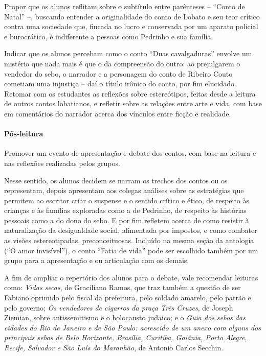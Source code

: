 \documentclass[11pt]{extarticle}
\begin{document}
Propor que os alunos reflitam sobre o subtítulo entre parênteses --
``Conto de Natal'' --, buscando entender a originalidade do conto de
Lobato e seu teor crítico contra uma sociedade que, fincada no lucro e
conservada por um aparato policial e burocrático, é indiferente a
pessoas como Pedrinho e sua família.

Indicar que os alunos percebam como o conto ``Duas cavalgaduras''
envolve um mistério que nada mais é que o da compreensão do outro: ao
prejulgarem o vendedor do sebo, o narrador e a personagem do conto de
Ribeiro Couto cometiam uma injustiça -- daí o título irônico do conto,
por fim elucidado. Retomar com os estudantes as reflexões sobre
estereótipos, feitas desde a leitura de outros contos lobatianos, e
refletir sobre as relações entre arte e vida, com base em comentários do
narrador acerca dos vínculos entre ficção e realidade.

\asterisc\paragraph{Pós-leitura}

Promover um evento de apresentação e debate dos contos, com base na
leitura e nas reflexões realizadas pelos grupos.

Nesse sentido, os alunos decidem se narram os trechos dos contos ou os
representam, depois apresentam aos colegas análises sobre as estratégias
que permitem ao escritor criar o suspense e o sentido crítico e ético,
de respeito às crianças e às famílias exploradas como a de Pedrinho, de
respeito às histórias pessoais como a do dono do sebo. E por fim
refletem acerca de como resistir à naturalização da desigualdade social,
alimentada por impostos, e como combater as visões estereotipadas,
preconceituosas. Incluído na mesma seção da antologia (``O amor
invisível''), o conto ``Fatia de vida'' pode ser escolhido também por um
grupo para a apresentação e ou articulação com os demais.

A fim de ampliar o repertório dos alunos para o debate, vale recomendar
leituras como: \emph{Vidas secas}, de Graciliano Ramos, que traz também
a questão de ser Fabiano oprimido pelo fiscal da prefeitura, pelo
soldado amarelo, pelo patrão e pelo governo; \emph{Os vendedores de
cigarros da praça Três Cruzes}, de Joseph Ziemian, sobre antissemitismo
e o holocausto judaico; e o \emph{Guia dos sebos das cidades do Rio de
Janeiro e de São Paulo: acrescido de um anexo com alguns dos principais
sebos de Belo Horizonte, Brasília, Curitiba, Goiânia, Porto Alegre,
Recife, Salvador e São Luís do Maranhão}, de Antonio Carlos Secchin.
\end{document}
